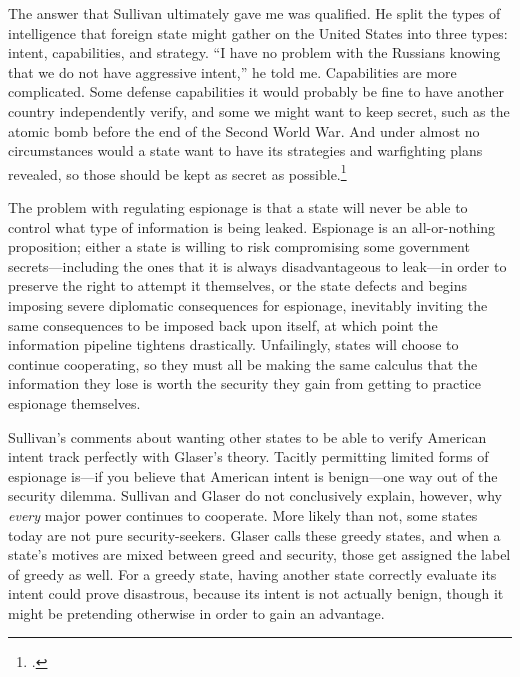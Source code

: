 \documentclass{memoir}
\begin{document}
\begin{refsegment}
The answer that Sullivan ultimately gave me was qualified. He split the types of intelligence that foreign state might gather on the United States into three types: intent, capabilities, and strategy. ``I have no problem with the Russians knowing that we do not have aggressive intent,'' he told me. Capabilities are more complicated. Some defense capabilities it would probably be fine to have another country independently verify, and some we might want to keep secret, such as the atomic bomb before the end of the Second World War. And under almost no circumstances would a state want to have its strategies and warfighting plans revealed, so those should be kept as secret as possible.\footcite{sullivan_personal_2019}

The problem with regulating espionage is that a state will never be able to control what type of information is being leaked. Espionage is an all-or-nothing proposition; either a state is willing to risk compromising some government secrets---including the ones that it is always disadvantageous to leak---in order to preserve the right to attempt it themselves, or the state defects and begins imposing severe diplomatic consequences for espionage, inevitably inviting the same consequences to be imposed back upon itself, at which point the information pipeline tightens drastically. Unfailingly, states will choose to continue cooperating, so they must all be making the same calculus that the information they lose is worth the security they gain from getting to practice espionage themselves.

Sullivan's comments about wanting other states to be able to verify American intent track perfectly with Glaser's theory. Tacitly permitting limited forms of espionage is---if you believe that American intent is benign---one way out of the security dilemma. Sullivan and Glaser do not conclusively explain, however, why \emph{every} major power continues to cooperate. More likely than not, some states today are not pure security-seekers. Glaser calls these greedy states, and when a state's motives are mixed between greed and security, those get assigned the label of greedy as well. For a greedy state, having another state correctly evaluate its intent could prove disastrous, because its intent is not actually benign, though it might be pretending otherwise in order to gain an advantage.


\end{refsegment}
\end{document}
